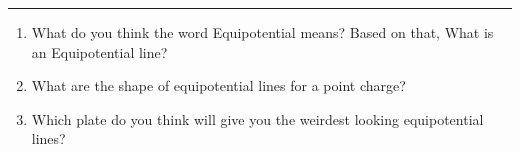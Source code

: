 \documentclass[11pt]{article}
\begin{document}
\Large

\medskip\hrule\bigskip\bigskip
{}
\begin{enumerate}

\item What do you think the word Equipotential means? Based on that, What is an Equipotential line?
  \vspace*{0.27\textheight}
\item What are the shape of equipotential lines for a point charge?
  \vspace*{0.27\textheight}
\item Which plate do you think will give you the weirdest looking equipotential lines?
  
\end{enumerate}
\end{document}
